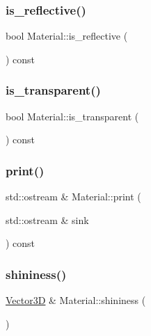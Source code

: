 \mbox{\label{classMaterial_a2acf2b5d1f12b1a8d307e6d22269b795}} 
\subsubsection{\texorpdfstring{is\_reflective()}{is\_reflective()}}
{\footnotesize\ttfamily bool Material\+::is\+\_\+reflective (\begin{DoxyParamCaption}{ }\end{DoxyParamCaption}) const}

\mbox{\label{classMaterial_affa2e5ddf19bbfef02cb7dedf0e92e1f}} 
\subsubsection{\texorpdfstring{is\_transparent()}{is\_transparent()}}
{\footnotesize\ttfamily bool Material\+::is\+\_\+transparent (\begin{DoxyParamCaption}{ }\end{DoxyParamCaption}) const}

\mbox{\label{classMaterial_a31974b6cb26ecfe1389ab701495b28ea}} 
\subsubsection{\texorpdfstring{print()}{print()}}
{\footnotesize\ttfamily std\+::ostream \& Material\+::print (\begin{DoxyParamCaption}\item[{std\+::ostream \&}]{sink }\end{DoxyParamCaption}) const}

\mbox{\label{classMaterial_abd4573ad64b9e4ebc7d3a365e2078d69}} 
\subsubsection{\texorpdfstring{shininess()}{shininess()}}
{\footnotesize\ttfamily \mbox{\hyperlink{classVector3D}{Vector3D}} \& Material\+::shininess (\begin{DoxyParamCaption}{ }\end{DoxyParamCaption})}

